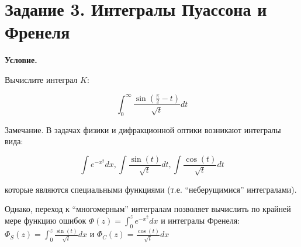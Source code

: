 \section{Задание 3. Интегралы Пуассона и Френеля}

\textbf{Условие.}

Вычислите интеграл $K$:

\[\int_0^\infty \frac{\sin\left(\frac{\pi}{2} - t\right)}{\sqrt{t}} dt\]

Замечание. В задачах физики и дифракционной оптики возникают интегралы вида:

\[\int e^{-x^2} dx, \int \frac{\sin(t)}{\sqrt{t}} dt, \int \frac{\cos(t)}{\sqrt{t}} dt\]

которые являются специальными функциями (т.е. \enquote{неберущимися} интегралами).

Однако, переход к \enquote{многомерным} интегралам позволяет вычислить по крайней мере функцию ошибок
$\Phi(z) = \int_0^z e^{-x^2} dx$ и интегралы Френеля: $\Phi_S(z) = \int_0^z \frac{\sin(t)}{\sqrt{t}} dx$ и $\Phi_C(z) = \frac{\cos(t)}{\sqrt{t}} dx$


